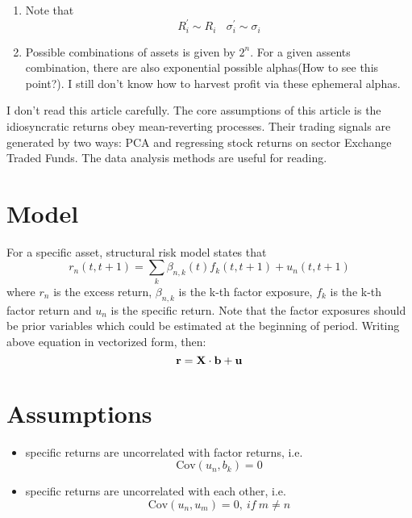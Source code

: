 \documentclass[fontsize=11pt, %
                             paper=a4, %
                             twoside, %
                             captions=tableheading,
                             index=totoc,
                             hyperref]{labbook}
\begin{document}
\begin{addmargin}[4cm]{0cm}
\begin{itemize}
\begin{enumerate}
\item
Note that
\begin{equation}
R_i^\prime \sim R_i \ \ \ \ \sigma_i^\prime \sim \sigma_i
\end{equation}
\item
Possible combinations of assets is given by $2^n$. For a given assents combination, there are also exponential possible alphas(How to see this point?). I still don't know how to harvest profit via these ephemeral alphas.
\end{enumerate}
\end{itemize}
I don't read this article carefully. The core assumptions of this article is the idiosyncratic returns obey mean-reverting processes. 
Their trading signals are generated by two ways: PCA and regressing stock returns on sector Exchange Traded Funds. The data analysis methods are useful for reading.
\section{Model}
For a specific asset, structural risk model states that
\begin{equation}
r_n(t,t+1)=\sum_k \beta_{n,k}(t)f_k(t,t+1)+u_n(t,t+1)
\end{equation}
where $r_n$ is the excess return, $\beta_{n,k}$ is the k-th factor exposure, $f_k$ is the k-th factor return and $u_n$ is the specific return. Note that the factor exposures should be prior variables which could be estimated at the beginning of period. Writing above equation in vectorized form, then:
\begin{equation}
\mathbf{r} =\mathbf{X} \cdot \mathbf{b} +\mathbf{u}
\end{equation}
\section{Assumptions}
\begin{itemize}
\item
specific returns are uncorrelated with factor returns, i.e.
\begin{equation}
\mathrm{Cov}(u_n,b_k)=0
\end{equation}
\item
specific returns are uncorrelated with each other, i.e.
\begin{equation}
\mathrm{Cov}(u_n,u_m)=0,\ if \ m\neq n
\end{equation}
\end{itemize}

\end{addmargin}
\end{document}
